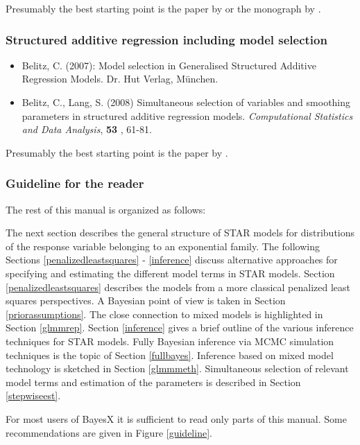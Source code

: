 \documentclass[11pt,a4paper,twoside]{bayesxarticle}
\begin{document}
Presumably the best starting point is the paper by  or the monograph by .

\subsubsection*{Structured additive regression including model selection}

\begin{itemize}
\item Belitz, C. (2007): Model selection in Generalised Structured Additive Regression Models. Dr. Hut Verlag, M\"{u}nchen.
\item Belitz, C., Lang, S. (2008) Simultaneous selection of variables and smoothing parameters
in structured additive regression models. {\it
Computational Statistics and Data Analysis}, {\bf 53} , 61-81.
\end{itemize}

Presumably the best starting point is the paper by .

\subsubsection*{Guideline for the reader}


The rest of this manual is organized as follows:

The next section describes the general structure of STAR models for
distributions of the response variable belonging to an exponential
family. The following Sections \ref{penalizedleastsquares} -
\ref{inference} discuss alternative approaches for specifying and
estimating the different model terms in STAR models. Section
\ref{penalizedleastsquares} describes the models from a more
classical penalized least squares perspectives. A Bayesian point of
view is taken in Section \ref{priorassumptions}. The close
connection to mixed models is highlighted in Section \ref{glmmrep}.
Section \ref{inference} gives a brief outline of the various
inference techniques for STAR models. Fully Bayesian inference via
MCMC simulation techniques is the topic of Section \ref{fullbayes}.
Inference based on mixed model technology is sketched in Section
\ref{glmmmeth}. Simultaneous selection of relevant model terms and
estimation of the parameters is described in Section
\ref{stepwiseest}.

For most users of BayesX it is sufficient to read only parts of this
manual. Some recommendations are given in Figure \ref{guideline}.
\end{document}
